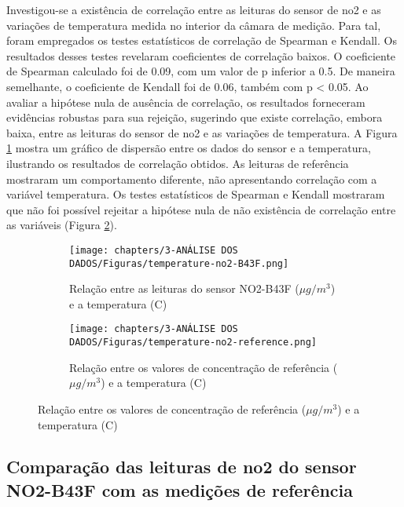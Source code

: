 Investigou-se a existência de correlação entre as leituras do sensor de \acrshort{no2} e as variações de temperatura medida no interior da câmara de medição. Para tal, foram empregados os testes estatísticos de correlação de Spearman e Kendall. Os resultados desses testes revelaram coeficientes de correlação baixos. O coeficiente de Spearman calculado foi de 0.09, com um valor de p inferior a 0.5. De maneira semelhante, o coeficiente de Kendall foi de 0.06, também com p < 0.05. Ao avaliar a hipótese nula de ausência de correlação, os resultados forneceram evidências robustas para sua rejeição, sugerindo que existe correlação, embora baixa, entre as leituras do sensor de \acrshort{no2} e as variações de temperatura. A Figura \ref{fig:data-temp-no2-corr} mostra um gráfico de dispersão entre os dados do sensor e a temperatura, ilustrando os resultados de correlação obtidos. As leituras de referência mostraram um comportamento diferente, não apresentando correlação com a variável temperatura. Os testes estatísticos de Spearman e Kendall mostraram que não foi possível rejeitar a hipótese nula de não existência de correlação entre as variáveis (Figura \ref{fig:data-temp-no2-ref-corr}).

\begin{figure}[h]
    \centering
    \caption{Relação dos dados de concentração de \acrshort{no2} com a temperatura}
    \begin{subfigure}{0.5\textwidth}
        \texttt{[image: chapters/3-ANÁLISE DOS DADOS/Figuras/temperature-no2-B43F.png]}
        \caption{Relação entre as leituras do sensor NO2-B43F (\(\mu g/m^3\)) e a temperatura (\textdegree C)}
        \label{fig:data-temp-no2-corr}
    \end{subfigure}
    \hfill
    \begin{subfigure}{0.48\textwidth}
        \texttt{[image: chapters/3-ANÁLISE DOS DADOS/Figuras/temperature-no2-reference.png]}
        \caption{Relação entre os valores de concentração de referência (\(\mu g/m^3\)) e a temperatura (\textdegree C)}
        \label{fig:data-temp-no2-ref-corr}
    \end{subfigure}
    \hfill
    \label{fig:data-no2-temp}
\end{figure}

\subsection{Comparação das leituras de \acrshort{no2} do sensor NO2-B43F com as medições de referência}

